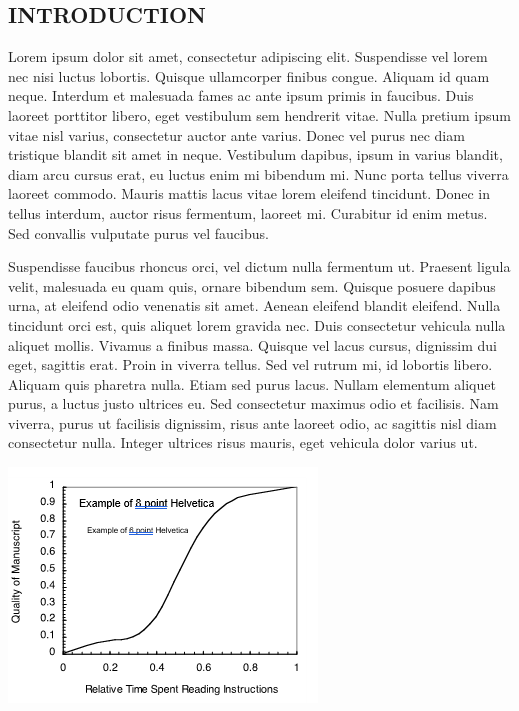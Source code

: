 \documentclass[10pt]{article}
\begin{document}
\begin{multicols}{2}
\section{INTRODUCTION}
Lorem ipsum dolor sit amet, consectetur adipiscing elit. Suspendisse vel lorem nec nisi luctus lobortis. Quisque ullamcorper finibus congue. Aliquam id quam neque. Interdum et malesuada fames ac ante ipsum primis in faucibus. Duis laoreet porttitor libero, eget vestibulum sem hendrerit vitae. Nulla pretium ipsum vitae nisl varius, consectetur auctor ante varius. Donec vel purus nec diam tristique blandit sit amet in neque. Vestibulum dapibus, ipsum in varius blandit, diam arcu cursus erat, eu luctus enim mi bibendum mi. Nunc porta tellus viverra laoreet commodo. Mauris mattis lacus vitae lorem eleifend tincidunt. Donec in tellus interdum, auctor risus fermentum, laoreet mi. Curabitur id enim metus. Sed convallis vulputate purus vel faucibus.\cite{cantrell2000}

Suspendisse faucibus rhoncus orci, vel dictum nulla fermentum ut. Praesent ligula velit, malesuada eu quam quis, ornare bibendum sem. Quisque posuere dapibus urna, at eleifend odio venenatis sit amet. Aenean eleifend blandit eleifend. Nulla tincidunt orci est, quis aliquet lorem gravida nec. Duis consectetur vehicula nulla aliquet mollis. Vivamus a finibus massa. Quisque vel lacus cursus, dignissim dui eget, sagittis erat. Proin in viverra tellus. Sed vel rutrum mi, id lobortis libero. Aliquam quis pharetra nulla. Etiam sed purus lacus. Nullam elementum aliquet purus, a luctus justo ultrices eu. Sed consectetur maximus odio et facilisis. Nam viverra, purus ut facilisis dignissim, risus ante laoreet odio, ac sagittis nisl diam consectetur nulla. Integer ultrices risus mauris, eget vehicula dolor varius ut.

\vspace{12pt}

\noindent
\includegraphics[width=\linewidth]{img.png}


\end{multicols}
\end{document}
